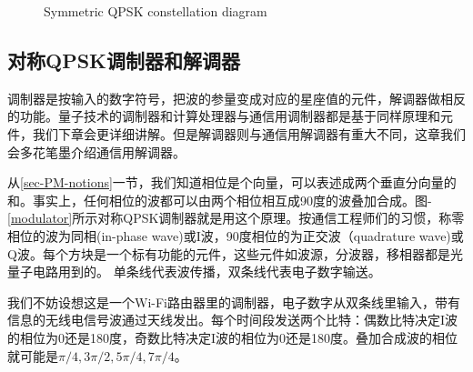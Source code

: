 \documentclass{ctexbook}
\begin{document}
\begin{figure}[h]\label{sQPSK}
\caption{Symmetric QPSK constellation diagram}
\end{figure}

\subsection{对称QPSK调制器和解调器}\label{Sec-demodulator}
调制器是按输入的数字符号，把波的参量变成对应的星座值的元件，解调器做相反的功能。量子技术的调制器和计算处理器与通信用调制器都是基于同样原理和元件，我们下章会更详细讲解。但是解调器则与通信用解调器有重大不同，这章我们会多花笔墨介绍通信用解调器。

从\ref{sec-PM-notions}一节，我们知道相位是个向量，可以表述成两个垂直分向量的和。事实上，任何相位的波都可以由两个相位相互成90度的波叠加合成。图-\ref{modulator}所示对称QPSK调制器就是用这个原理。按通信工程师们的习惯，称零相位的波为同相(in-phase wave)或I波，90度相位的为正交波（quadrature wave)或Q波。每个方块是一个标有功能的元件，这些元件如波源，分波器，移相器都是光量子电路用到的。
单条线代表波传播，双条线代表电子数字输送。

我们不妨设想这是一个Wi-Fi路由器里的调制器，电子数字从双条线里输入，带有信息的无线电信号波通过天线发出。每个时间段发送两个比特：偶数比特决定I波的相位为0还是180度，奇数比特决定I波的相位为0还是180度。叠加合成波的相位就可能是$\pi/4, 3\pi/2, 5\pi/4, 7\pi/4$。
\end{document}
